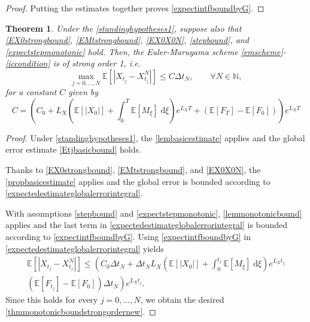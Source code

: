 \documentclass[reqno,12pt]{amsart}
\theoremstyle{plain}%
\newtheorem{thm}{Theorem}[section]
\theoremstyle{definition}
\begin{document}
\begin{proof}
    Putting the estimates together proves \eqref{expectintfboundbyG}.
\end{proof}

\begin{thm}
    \label{thmmonotonicbound}
    Under the \cref{standinghypotheses1}, suppose also that
    \eqref{EX0strongbound}, \eqref{EMtstrongbound}, \eqref{EX0X0N}, \eqref{stepbound}, and \eqref{expectstepmonotonic} hold. Then, the Euler-Maruyama scheme \eqref{emscheme}-\eqref{iccondition} is of strong order 1, i.e.
    \begin{equation}
      \label{thmmonotonicboundstrongordernew}
        \max_{j=0, \ldots, N}\mathbb{E}\left[ \left| X_{t_j} - X_{t_j}^N \right| \right] \leq C \Delta t_N, \qquad \forall N \in \mathbb{N},
    \end{equation}
    for a constant $C$ given by
    \begin{equation}
        \label{constmonotonicboundstrongordernew}
        C = \left(C_0 + L_X \left(\mathbb{E}[|X_0|] + \int_0^{T} \mathbb{E}[M_\xi]\;\mathrm{d}\xi\right)e^{L_X T} + (\mathbb{E}[F_T] - \mathbb{E}[F_0])\right)e^{L_X T}
    \end{equation}
\end{thm}

\begin{proof}
    Under \cref{standinghypotheses1}, the \cref{lembasicestimate} applies and the global error estimate \eqref{Etjbasicbound} holds.
    
    Thanks to \eqref{EX0strongbound}, \eqref{EMtstrongbound}, and \eqref{EX0X0N}, the \cref{propbasicestimate} applies and the global error is bounded according to \eqref{expectedestimateglobalerrorintegral}.
    
    With assumptions \eqref{stepbound} and \eqref{expectstepmonotonic}, \cref{lemmonotonicbound} applies and the last term in \eqref{expectedestimateglobalerrorintegral} is bounded according to \eqref{expectintfboundbyG}. Using \eqref{expectintfboundbyG} in \eqref{expectedestimateglobalerrorintegral} yields
    \begin{multline*}
        \mathbb{E} \left[|X_{t_j} - X_{t_j}^N|\right] \leq \left( C_0 \Delta t_N + \Delta t_N L_X \left(\mathbb{E}[|X_0|] + \int_0^{t_j} \mathbb{E}[M_\xi]\;\mathrm{d}\xi\right)e^{L_X t_j}\right. \\
        \left. (\mathbb{E}[F_{t_j}] - \mathbb{E}[F_0])\Delta t_N\right) e^{L_X t_j}.
    \end{multline*}
    Since this holds for every $j=0, \ldots, N$, we obtain the desired \eqref{thmmonotonicboundstrongordernew}.
\end{proof}
\end{document}

